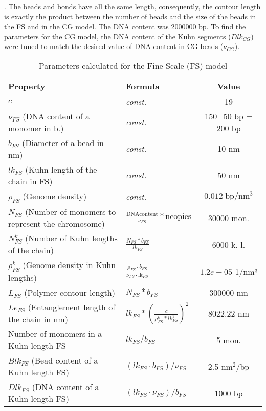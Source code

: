 .
The beads and bonds have all the same length, consequently, the contour length is exactly the product between the number of beads and the size of the beads in the FS and in the CG model. The DNA content was 2000000 bp. To find the parameters for the CG model, the DNA content of the Kuhn segments ($Dlk_{CG}$) were tuned to match the desired value of DNA content in CG beads ($\nu_{CG}$).


\begin{table}[H]

\begin{tabular}{|l|l|c|}
\hline
\textbf{Property} & \textbf{Formula} & \textbf{Value}\\
\hline
\textbf{$c$} & \textit{const.} & 19\\
\hline
\textbf{$\nu_{FS}$} (DNA content of a monomer in b.) & \textit{const.} & 150+50 bp = 200 bp\\
\hline
\textbf{$b_{FS}$} (Diameter of a bead in nm) & \textit{const.} & 10 nm\\
\hline
\textbf{$lk_{FS}$} (Kuhn length of the chain  in FS) & \textit{const.} & 50 nm \\
\hline
\textbf{$\rho_{FS}$} (Genome density) &\textit{const.} & $0.012\; \text{bp}/\text{nm}^3$ \\ %
\hline
\textbf{$N_{FS}$} (Number of monomers to represent the chromosome) & $\frac{\text{DNAcontent}}{\nu_{FS}} * \text{ncopies}$ & 30000 mon.\\
\hline
\textbf{$N^k_{FS}$} (Number of Kuhn lengths of the chain) & $\frac{N_{FS} * b_{FS}}{lk_{FS}}$ & 6000 k. l.\\
\hline
\textbf{$\rho^k_{FS}$} (Genome density in Kuhn lengths) & $\frac{\rho_{FS} \cdot b_{FS}}{\nu_{FS} \cdot \text{lk}_{FS}}$& $1.2e-05$ 1/nm³\\
\hline
\textbf{$L_{FS}$} (Polymer contour length) & $N_{FS} * b_{FS}$ & 300000 nm\\
\hline
\textbf{$Le_{FS}$} (Entanglement length of the chain in nm) & $lk_{FS} * \left(\frac{c}{\rho^k_{FS} * lk_{FS}^3}\right)^2$ & 8022.22 nm\\
\hline
Number of monomers in a Kuhn length FS & $lk_{FS}/b_{FS}$ & 5 mon.\\
\hline
$Blk_{FS}$ (Bead content of a Kuhn length FS) & $(lk_{FS} \cdot b_{FS})/\nu_{FS}$ & 2.5 $\text{nm}^2$/bp  \\
\hline
$Dlk_{FS}$ (DNA content of a Kuhn length FS) & $(lk_{FS} \cdot \nu_{FS})/b_{FS}$ & 1000 $\text{bp}$\\
\hline
\end{tabular}
\label{tab: parameters FS}
\caption{Parameters calculated for the Fine Scale (FS) model}
\end{table}

